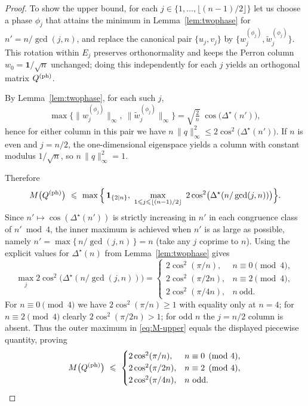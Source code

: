 \documentclass[12pt,fleqn]{amsart}
\renewcommand{\le}{\leqslant}
\renewcommand{\ge}{\geqslant}
\theoremstyle{definition}
\theoremstyle{remark}
\newcommand{\1}{\mathbf{1}}
\begin{document}
\begin{proof}
To show the upper bound, for each $j\in\{1,\dots,\lfloor (n-1)/2\rfloor\}$ let us choose a phase $\phi_j$ that attains the minimum in Lemma~\ref{lem:twophase} for $n'=n/\gcd(j,n)$, and replace the canonical pair $\{u_j,v_j\}$ by $\{w_j^{(\phi_j)},\tilde w_j^{(\phi_j)}\}$. This rotation within $E_j$ preserves orthonormality and keeps the Perron column $w_0=\1/\sqrt n$ unchanged; doing this independently for each $j$ yields an orthogonal matrix $Q^{\rm (ph)}$.

By Lemma~\ref{lem:twophase}, for each such $j$,
\[
\max\big\{\|w_j^{(\phi_j)}\|_\infty,\ \|\tilde w_j^{(\phi_j)}\|_\infty\big\}
=\sqrt{\tfrac{2}{n}}\;\cos\!\big(\Delta^\star(n')\big),
\]
hence for either column in this pair we have
\(
n\,\|q\|_\infty^2\le 2\cos^2\!\big(\Delta^\star(n')\big).
\)
If $n$ is even and $j=n/2$, the one-dimensional eigenspace yields a column with constant modulus $1/\sqrt n$, so $n\,\|q\|_\infty^2=1$.

Therefore
\begin{equation}\label{eq:M-upper}
M\big(Q^{\rm (ph)}\big)\ \le\ \max\Big\{\,\mathbf{1}_{\{2\mid n\}},\ \max_{1\le j\le \lfloor (n-1)/2\rfloor}\ 2\cos^2\!\big(\Delta^\star(n/\gcd(j,n))\big)\Big\}.
\end{equation}
Since $n'\mapsto \cos(\Delta^\star(n'))$ is strictly increasing in $n'$ in each congruence class of $n'\bmod 4$, the inner maximum is achieved when $n'$ is as large as possible, namely $n'=\max\{\,n/\gcd(j,n)\,\}=n$ (take any $j$ coprime to $n$). Using the explicit values for $\Delta^\star(n)$ from Lemma~\ref{lem:twophase} gives
\[
\max_{j}2\cos^2\!\big(\Delta^\star(n/\gcd(j,n))\big)
=
\begin{cases}
2\cos^2(\pi/n), & n\equiv 0\pmod 4,\\[1mm]
2\cos^2(\pi/2n), & n\equiv 2\pmod 4,\\[1mm]
2\cos^2(\pi/4n), & n\ \text{odd}.
\end{cases}
\]
For $n\equiv 0\pmod 4$ we have $2\cos^2(\pi/n)\ge 1$ with equality only at $n=4$; for $n\equiv 2\pmod 4$ clearly $2\cos^2(\pi/2n)>1$; for odd $n$ the $j=n/2$ column is absent. Thus the outer maximum in \eqref{eq:M-upper} equals the displayed piecewise quantity, proving
\[
M\big(Q^{\rm (ph)}\big)\ \le\
\begin{cases}
2\cos^2(\pi/n), & n\equiv 0\pmod 4,\\
2\cos^2(\pi/2n), & n\equiv 2\pmod 4,\\
2\cos^2(\pi/4n), & n\ \text{odd}.
\end{cases}
\]


\end{proof}
\end{document}
